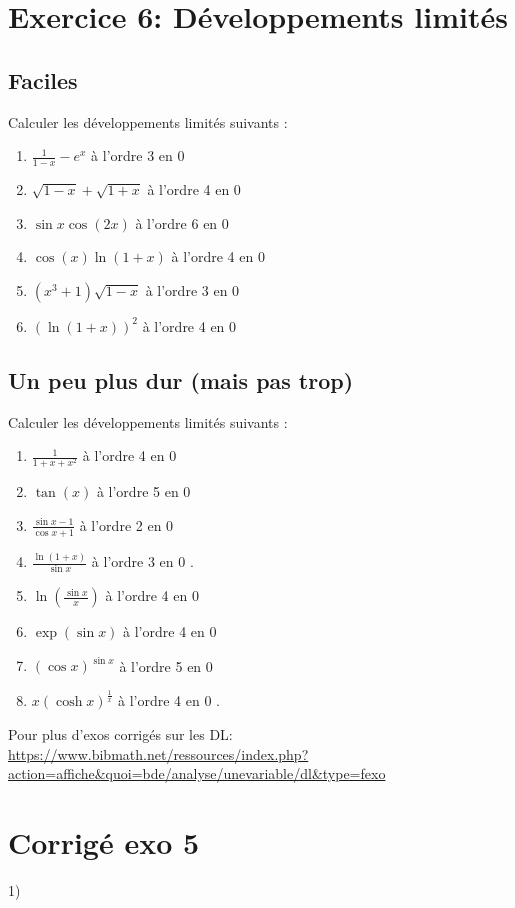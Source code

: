 \section*{Exercice 6: Développements limités}
\subsection*{Faciles}
Calculer les développements limités suivants :
\begin{enumerate}
  \item $\frac{1}{1-x}-e^x$ à l'ordre 3 en 0
  \item $\sqrt{1-x}+\sqrt{1+x}$ à l'ordre 4 en 0
  \item $\sin x \cos (2 x)$ à l'ordre 6 en 0
  \item $\cos (x) \ln (1+x)$ à l'ordre 4 en 0
  \item $\left(x^3+1\right) \sqrt{1-x}$ à l'ordre 3 en 0
  \item $(\ln (1+x))^2$ à l'ordre 4 en 0
\end{enumerate}

\subsection*{Un peu plus dur (mais pas trop)}
Calculer les développements limités suivants :

\begin{enumerate}
  \item $\frac{1}{1+x+x^2}$ à l'ordre 4 en 0
  \item $\tan (x)$ à l'ordre 5 en 0
  \item $\frac{\sin x-1}{\cos x+1}$ à l'ordre 2 en 0
  \item $\frac{\ln (1+x)}{\sin x}$ à l'ordre 3 en 0 .
  \item $\ln \left(\frac{\sin x}{x}\right)$ à l'ordre 4 en 0
  \item $\exp (\sin x)$ à l'ordre 4 en 0
  \item $(\cos x)^{\sin x}$ à l'ordre 5 en 0
  \item $x(\cosh x)^{\frac{1}{x}}$ à l'ordre 4 en 0 .
\end{enumerate}

Pour plus d'exos corrigés sur les DL: \url{https://www.bibmath.net/ressources/index.php?action=affiche&quoi=bde/analyse/unevariable/dl&type=fexo}

\section*{Corrigé exo 5}
1)

